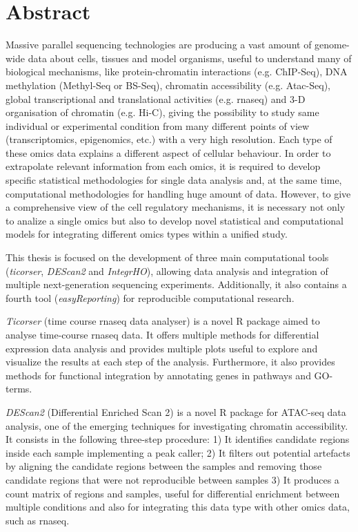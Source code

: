 \section*{Abstract}
{\setlength{\parindent}{0cm}
Massive parallel sequencing technologies are producing a vast amount of genome-wide data about cells, tissues and model organisms, useful to understand many of biological mechanisms, like protein-chromatin interactions (e.g. ChIP-Seq), DNA methylation (Methyl-Seq or BS-Seq), chromatin accessibility (e.g. Atac-Seq), global transcriptional and translational activities (e.g. \gls{rnaseq}) and 3-D organisation of chromatin (e.g. Hi-C), giving the possibility to study same individual or experimental condition from many different points of view (transcriptomics, epigenomics, etc.) with a very high resolution. Each type of these omics data explains a different aspect of cellular behaviour.
In order to extrapolate relevant information from each omics, it is required to develop specific statistical methodologies for single data analysis and, at the same time, computational methodologies for handling huge amount of data.
However, to give a comprehensive view of the cell regulatory mechanisms, it is necessary not only to analize a single omics but also to develop novel statistical and computational models for integrating different omics types within a unified study.

This thesis is focused on the development of three main computational tools (\textit{ticorser}, \textit{DEScan2} and \textit{IntegrHO}), allowing data analysis and integration of multiple next-generation sequencing experiments.
Additionally, it also contains a fourth tool (\textit{easyReporting}) for reproducible computational research.

\textit{Ticorser} (time course \gls{rnaseq} data analyser) is a novel R package aimed to analyse time-course \gls{rnaseq} data. It offers multiple methods for differential expression data analysis and provides multiple plots useful to explore and visualize the results at each step of the analysis. Furthermore, it also provides methods for functional integration by annotating genes in pathways and GO-terms.

\textit{DEScan2} (Differential Enriched Scan 2) is a novel R package for ATAC-seq data analysis, one of the emerging techniques for investigating chromatin accessibility. It consists in the following three-step procedure: 1) It identifies candidate regions inside each sample implementing a peak caller; 2) It filters out potential artefacts by aligning the candidate regions between the samples and removing those candidate regions that were not reproducible between samples 3) It produces a count matrix of regions and samples, useful for differential enrichment between multiple conditions and also for integrating this data type with other omics data, such as \gls{rnaseq}.

}

